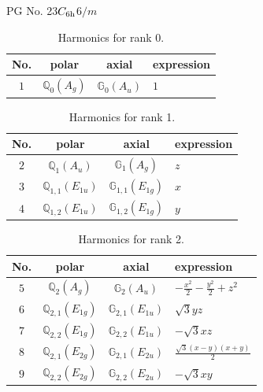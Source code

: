 \documentclass[fleqn,8pt,landscape]{jsarticle}
\begin{document}
\setcounter{MaxMatrixCols}{32}

\renewcommand{\tablename}{Table~}
\renewcommand{\figurename}{Figure~}
\begin{center}
\LARGE
PG No. 23\quad$C_{\rm 6h}$\quad$6/m$\quad[ hexagonal ]
\end{center}
\begin{table}[ht!]
\begin{center}
\caption{Harmonics for rank 0.}
\renewcommand{\arraystretch}{1.3}
\begin{tabular}{cccl} \hline \hline
No. & polar & axial & expression \\ \hline
$ 1 $ & $ \mathbb{Q}_{0}(A_{g}) $ & $ \mathbb{G}_{0}(A_{u}) $ & $ 1 $ \\
 \hline \hline
\end{tabular}
\end{center}
\end{table}
\begin{table}[ht!]
\begin{center}
\caption{Harmonics for rank 1.}
\renewcommand{\arraystretch}{1.3}
\begin{tabular}{cccl} \hline \hline
No. & polar & axial & expression \\ \hline
$ 2 $ & $ \mathbb{Q}_{1}(A_{u}) $ & $ \mathbb{G}_{1}(A_{g}) $ & $ z $ \\
$ 3 $ & $ \mathbb{Q}_{1,1}(E_{1u}) $ & $ \mathbb{G}_{1,1}(E_{1g}) $ & $ x $ \\
$ 4 $ & $ \mathbb{Q}_{1,2}(E_{1u}) $ & $ \mathbb{G}_{1,2}(E_{1g}) $ & $ y $ \\
 \hline \hline
\end{tabular}
\end{center}
\end{table}
\begin{table}[ht!]
\begin{center}
\caption{Harmonics for rank 2.}
\renewcommand{\arraystretch}{1.3}
\begin{tabular}{cccl} \hline \hline
No. & polar & axial & expression \\ \hline
$ 5 $ & $ \mathbb{Q}_{2}(A_{g}) $ & $ \mathbb{G}_{2}(A_{u}) $ & $ - \frac{x^{2}}{2} - \frac{y^{2}}{2} + z^{2} $ \\
$ 6 $ & $ \mathbb{Q}_{2,1}(E_{1g}) $ & $ \mathbb{G}_{2,1}(E_{1u}) $ & $ \sqrt{3} y z $ \\
$ 7 $ & $ \mathbb{Q}_{2,2}(E_{1g}) $ & $ \mathbb{G}_{2,2}(E_{1u}) $ & $ - \sqrt{3} x z $ \\
$ 8 $ & $ \mathbb{Q}_{2,1}(E_{2g}) $ & $ \mathbb{G}_{2,1}(E_{2u}) $ & $ \frac{\sqrt{3} \left(x - y\right) \left(x + y\right)}{2} $ \\
$ 9 $ & $ \mathbb{Q}_{2,2}(E_{2g}) $ & $ \mathbb{G}_{2,2}(E_{2u}) $ & $ - \sqrt{3} x y $ \\
 \hline \hline
\end{tabular}
\end{center}
\end{table}
\end{document}
